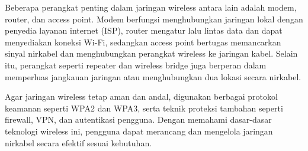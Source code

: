Beberapa perangkat penting dalam jaringan wireless antara lain adalah modem, router, dan access point. Modem berfungsi menghubungkan jaringan lokal dengan penyedia layanan internet (ISP), router mengatur lalu lintas data dan dapat menyediakan koneksi Wi-Fi, sedangkan access point bertugas memancarkan sinyal nirkabel dan menghubungkan perangkat wireless ke jaringan kabel. Selain itu, perangkat seperti repeater dan wireless bridge juga berperan dalam memperluas jangkauan jaringan atau menghubungkan dua lokasi secara nirkabel.

Agar jaringan wireless tetap aman dan andal, digunakan berbagai protokol keamanan seperti WPA2 dan WPA3, serta teknik proteksi tambahan seperti firewall, VPN, dan autentikasi pengguna. Dengan memahami dasar-dasar teknologi wireless ini, pengguna dapat merancang dan mengelola jaringan nirkabel secara efektif sesuai kebutuhan.

